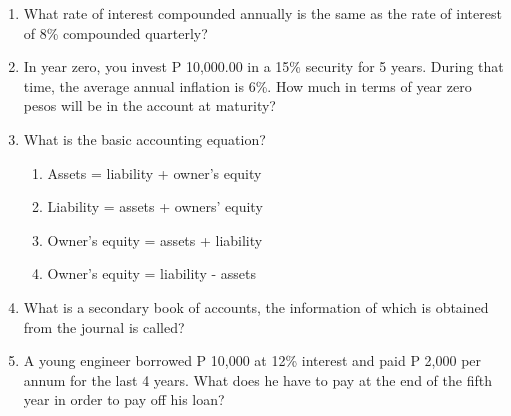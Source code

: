 \documentclass[11pt,a4paper]{article}
\begin{document}
\begin{enumerate}
\item{What rate of interest compounded annually is the same as the rate of interest of 8\% compounded quarterly?}
\\
\item{In year zero, you invest P 10,000.00 in a 15\% security for 5 years. During that time, the average annual inflation is 6\%. How much in terms of year zero pesos will be in the account at maturity?}
\\
\item{What is the basic accounting equation?}
\begin{enumerate}[label=\Alph*.]
\item{Assets = liability + owner's equity}
\item{Liability = assets + owners' equity}
\item{Owner's equity = assets + liability}
\item{Owner's equity = liability - assets}
\end{enumerate}
\item{What is a secondary book of accounts, the information of which is obtained from the journal is called?}
\\
\item{A young engineer borrowed P 10,000 at 12\% interest and paid P 2,000 per annum for the last 4 years. What does he have to pay at the end of the fifth year in order to pay off his loan?}
\\\begin{enumerate*}[itemjoin=\qquad, label=\Alph*.]

\end{enumerate*}
\end{enumerate}
\end{document}
